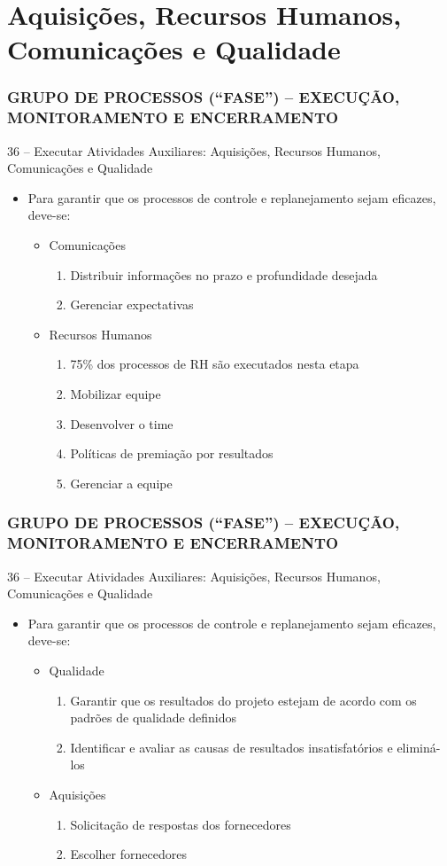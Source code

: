 \section{Aquisições, Recursos Humanos, Comunicações e Qualidade}
\begin{frame}
 \frametitle{GRUPO DE PROCESSOS (“FASE”) – \small{EXECUÇÃO, MONITORAMENTO E ENCERRAMENTO}}
 36 – Executar Atividades Auxiliares: Aquisições, Recursos Humanos, Comunicações e Qualidade
\begin{itemize}
 \item Para garantir que os processos de controle e replanejamento sejam eficazes, deve-se:
 \begin{itemize}
  \item Comunicações
  \begin{enumerate}
   \item Distribuir informações no prazo e profundidade desejada
    \item Gerenciar expectativas
  \end{enumerate}
  \item Recursos Humanos
  \begin{enumerate}
   \item 75\% dos processos de RH são executados nesta etapa
    \item Mobilizar equipe
    \item Desenvolver o time
    \item Políticas de premiação por resultados
    \item Gerenciar a equipe
  \end{enumerate}
 \end{itemize}
\end{itemize}
\end{frame}

\begin{frame}
 \frametitle{GRUPO DE PROCESSOS (“FASE”) – \small{EXECUÇÃO, MONITORAMENTO E ENCERRAMENTO}}
 36 – Executar Atividades Auxiliares: Aquisições, Recursos Humanos, Comunicações e Qualidade
\begin{itemize}
 \item Para garantir que os processos de controle e replanejamento sejam eficazes, deve-se:
 \begin{itemize}
  \item Qualidade
  \begin{enumerate}
   \item Garantir que os resultados do projeto estejam de acordo com os padrões de qualidade definidos
   \item Identificar e avaliar as causas de resultados insatisfatórios e eliminá-los
  \end{enumerate}
  \item Aquisições
  \begin{enumerate}
   \item Solicitação de respostas dos fornecedores
    \item Escolher fornecedores
  \end{enumerate}
 \end{itemize}
\end{itemize}
\end{frame}

